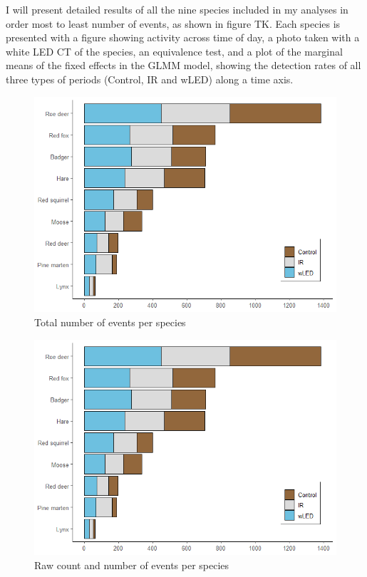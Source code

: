 I will present detailed results of all the nine species included in my analyses in order most to least number of events, as shown in figure TK. %
Each species is presented with a figure showing activity across time of day, a photo taken with a white LED CT of the species, %
an equivalence test, and a plot of the marginal means of the fixed effects in the GLMM model, showing the detection rates of all three types of periods (Control, IR and wLED) along a time axis.


\begin{figure}
 \centering
	\includegraphics[scale=.9]{../R/glmm_sp_files/figure-html/events-1.png}
 \caption[Total number of events per species]
 {Total number of events per species}
 \label{fig:events}
\end{figure}


\begin{figure}
 \centering
	\includegraphics[scale=.9]{../R/glmm_sp_files/figure-html/events-1.png}
 \caption{Raw count and number of events per species}
\end{figure}




